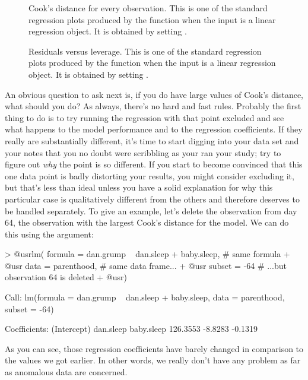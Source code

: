 \begin{figure}[p]
\begin{center}
\caption{Cook's distance for every observation. This is one of the standard regression plots produced by the  function when the input is a linear regression object. It is obtained by setting .}
\HR
\label{fig:regressionplot4}
\end{center}
\end{figure}

\begin{figure}[p]
\begin{center}
\caption{Residuals versus leverage. This is one of the standard regression plots produced by the  function when the input is a linear regression object. It is obtained by setting .}
\HR
\label{fig:regressionplot5}
\end{center}
\end{figure}



An obvious question to ask next is, if you do have large values of Cook's distance, what should you do? As always, there's no hard and fast rules. Probably the first thing to do is to try running the regression with that point excluded and see what happens to the model performance and to the regression coefficients. If they really are substantially different, it's time to start digging into your data set and your notes that you no doubt were scribbling as your ran your study; try to figure out {\it why} the point is so different. If you start to become convinced that this one data point is badly distorting your results, you might consider excluding it, but that's less than ideal unless you have a solid explanation for why this particular case is qualitatively different from the others and therefore deserves to be handled separately. To give an example, let's delete the observation from day 64, the observation with the largest Cook's distance for the  model. We can do this using the  argument:
\begin{rblock1}
> @usr{lm( formula = dan.grump ~ dan.sleep + baby.sleep,}  # same formula
+ @usr{    data = parenthood, }      # same data frame...
+ @usr{    subset = -64 }            # ...but observation 64 is deleted
+ @usr{)}

Call:
lm(formula = dan.grump ~ dan.sleep + baby.sleep, data = parenthood, 
    subset = -64)

Coefficients:
(Intercept)    dan.sleep   baby.sleep  
   126.3553      -8.8283      -0.1319  
\end{rblock1}
As you can see, those regression coefficients have barely changed in comparison to the values we got earlier. In other words, we really don't have any problem as far as anomalous data are concerned.






